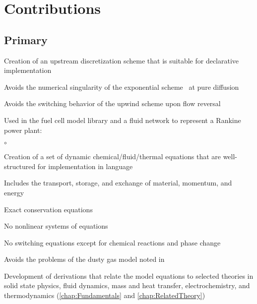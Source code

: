 \section{Contributions}

\subsection{Primary}

\begin{itemize*}

  \item Creation of an upstream discretization scheme that is suitable for declarative implementation
    \begin{itemize*}
      \item Avoids the numerical singularity of the exponential scheme~\cite{Patankar1980} at pure diffusion
      \item Avoids the switching behavior of the upwind scheme upon flow reversal
      \item Used in the fuel cell model library and a  fluid network to represent a Rankine power plant:\\
      \vspace{-4ex}
      \begin{itemize*}%
        \item[$\circ$] 
      \end{itemize*}
    \end{itemize*}
    
  \item Creation of a set of dynamic chemical\slash{}fluid\slash{}thermal equations that are well-structured for implementation in  language
    \begin{itemize*}
      \item Includes the transport, storage, and exchange of material, momentum, and energy
      \item Exact conservation equations
      \item No nonlinear systems of equations
      \item No switching equations except for chemical reactions and phase change
      \item Avoids the problems of the dusty gas model noted in~\cite{Kulikovsky1999, Weber2005}
    \end{itemize*}
  
  \item Development of derivations that relate the model equations to selected theories in solid state physics, fluid dynamics, mass and heat transfer, electrochemistry, and thermodynamics (\autoref{chap:Fundamentals} and \autoref{chap:RelatedTheory})


\end{itemize*}
